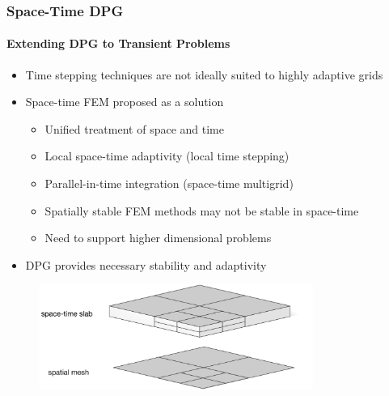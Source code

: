 \documentclass[18pt,xcolor=table]{beamer}
\begin{document}


\begin{frame}[t]
\frametitle{Space-Time DPG}
\framesubtitle{Extending DPG to Transient Problems}
\begin{itemize}
  \item Time stepping techniques are not ideally suited to highly adaptive grids
  \item Space-time FEM proposed as a solution
  \begin{itemize}
    \item[\textcolor{green}{\Checkmark}] Unified treatment of space and time
    \item[\textcolor{green}{\Checkmark}] Local space-time adaptivity (local time stepping)
    \item[\textcolor{green}{\Checkmark}] Parallel-in-time integration (space-time multigrid)
    \item[\XSolidBrush] Spatially stable FEM methods may not be stable in space-time
    \item[\XSolidBrush] Need to support higher dimensional problems
  \end{itemize}
  \item DPG provides necessary stability and adaptivity
\end{itemize}
\begin{figure}[b]
\centering
\includegraphics[width=0.8\textwidth]{Schematics/SpaceTimeSchematic}
\end{figure}
\end{frame}
\end{document}
